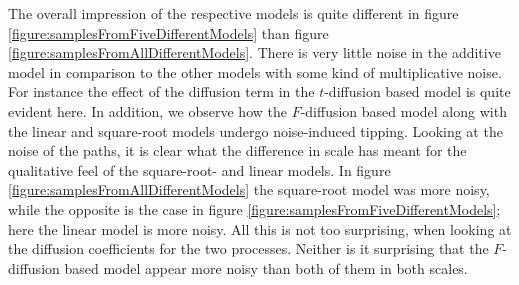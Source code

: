 The overall impression of the respective models is quite different in figure \ref{figure:samplesFromFiveDifferentModels} than figure \ref{figure:samplesFromAllDifferentModels}. There is very little noise in the additive model in comparison to the other models with some kind of multiplicative noise. For instance the effect of the diffusion term in the $t$-diffusion based model is quite evident here. In addition, we observe how the $F$-diffusion based model along with the linear and square-root models undergo noise-induced tipping. Looking at the noise of the paths, it is clear what the difference in scale has meant for the qualitative feel of the square-root- and linear models. In figure \ref{figure:samplesFromAllDifferentModels} the square-root model was more noisy, while the opposite is the case in figure \ref{figure:samplesFromFiveDifferentModels}; here the linear model is more noisy. All this is not too surprising, when looking at the diffusion coefficients for the two processes. Neither is it surprising that the $F$-diffusion based model appear more noisy than both of them in both scales.

